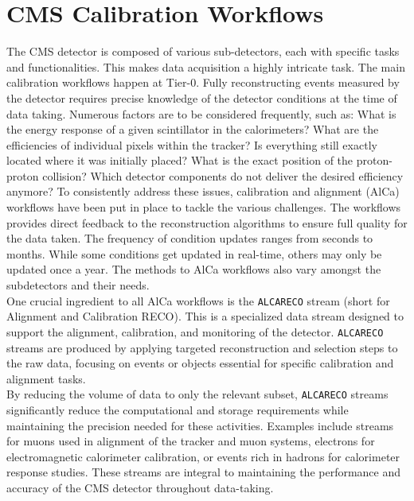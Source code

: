 \section{CMS Calibration Workflows}\label{sec:CMScalibration}
The CMS detector is composed of various sub-detectors, each with specific tasks and functionalities. This makes data acquisition a highly intricate task. The main calibration workflows happen at Tier-0. Fully reconstructing events measured by the detector requires precise knowledge of the detector conditions at the time of data taking. Numerous factors are to be considered frequently, such as: What is the energy response of a given scintillator in the calorimeters? What are the efficiencies of individual pixels within the tracker? Is everything still exactly located where it was initially placed? What is the exact position of the proton-proton collision? Which detector components do not deliver the desired efficiency anymore? To consistently address these issues, calibration and alignment (AlCa) workflows have been put in place to tackle the various challenges. The workflows provides direct feedback to the reconstruction algorithms to ensure full quality for the data taken. The frequency of condition updates ranges from seconds to months. While some conditions get updated in real-time, others may only be updated once a year. The methods to AlCa workflows also vary amongst the subdetectors and their needs.\\

One crucial ingredient to all AlCa workflows is the \texttt{ALCARECO} stream (short for Alignment and Calibration RECO).
This is a specialized data stream designed to support the alignment, calibration, and monitoring of the detector. \texttt{ALCARECO} streams are produced by applying targeted reconstruction and selection steps to the raw data, focusing on events or objects essential for specific calibration and alignment tasks.\\
By reducing the volume of data to only the relevant subset, \texttt{ALCARECO} streams significantly reduce the computational and storage requirements while maintaining the precision needed for these activities. Examples include streams for muons used in alignment of the tracker and muon systems, electrons for electromagnetic calorimeter calibration, or events rich in hadrons for calorimeter response studies. These streams are integral to maintaining the performance and accuracy of the CMS detector throughout data-taking.\\

